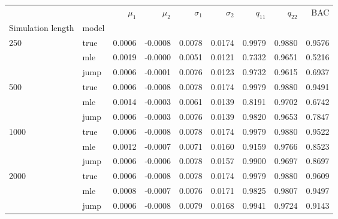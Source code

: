\begin{tabular}{llrrrrrrr}
\toprule
     &      &  $\mu_1$ &  $\mu_2$ &  $\sigma_1$ &  $\sigma_2$ &  $q_{11}$ &  $q_{22}$ &     BAC \\
Simulation length & model &          &          &             &             &           &           &         \\
\midrule
250  & true &   0.0006 &  -0.0008 &      0.0078 &      0.0174 &    0.9979 &    0.9880 &  0.9576 \\
     & mle &   0.0019 &  -0.0000 &      0.0051 &      0.0121 &    0.7332 &    0.9651 &  0.5216 \\
     & jump &   0.0006 &  -0.0001 &      0.0076 &      0.0123 &    0.9732 &    0.9615 &  0.6937 \\
500  & true &   0.0006 &  -0.0008 &      0.0078 &      0.0174 &    0.9979 &    0.9880 &  0.9491 \\
     & mle &   0.0014 &  -0.0003 &      0.0061 &      0.0139 &    0.8191 &    0.9702 &  0.6742 \\
     & jump &   0.0006 &  -0.0003 &      0.0076 &      0.0139 &    0.9820 &    0.9653 &  0.7847 \\
1000 & true &   0.0006 &  -0.0008 &      0.0078 &      0.0174 &    0.9979 &    0.9880 &  0.9522 \\
     & mle &   0.0012 &  -0.0007 &      0.0071 &      0.0160 &    0.9159 &    0.9766 &  0.8523 \\
     & jump &   0.0006 &  -0.0006 &      0.0078 &      0.0157 &    0.9900 &    0.9697 &  0.8697 \\
2000 & true &   0.0006 &  -0.0008 &      0.0078 &      0.0174 &    0.9979 &    0.9880 &  0.9609 \\
     & mle &   0.0008 &  -0.0007 &      0.0076 &      0.0171 &    0.9825 &    0.9807 &  0.9497 \\
     & jump &   0.0006 &  -0.0008 &      0.0079 &      0.0168 &    0.9941 &    0.9724 &  0.9143 \\
\bottomrule
\end{tabular}

